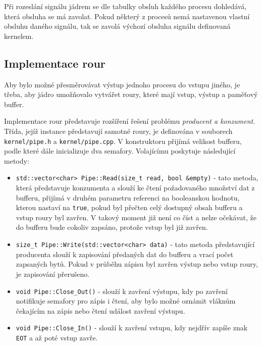 \documentclass[12pt, a4paper]{article}
\begin{document}
Při rozeslání signálu jádrem se dle tabulky obsluh každého procesu dohledává, která obsluha se má zavolat. Pokud některý z procesů nemá nastavenou vlastní obsluhu daného signálu, tak se zavolá výchozí obsluha signálu definovaná kernelem.

\subsection{Implementace rour}
Aby bylo možné přesměrovávat výstup jednoho procesu do vstupu jiného, je třeba, aby jádro umožňovalo vytvářet roury, které mají vstup, výstup a paměťový buffer.

Implementace rour představuje rozšíření řešení problému \textit{producent a konzument}. Třída, jejíž instance představují samotné roury, je definována v souborech \texttt{kernel/pipe.h} a \texttt{kernel/pipe.cpp}. V konstruktoru přijímá velikost bufferu, podle které dále inicializuje dva semafory. Volajícímu poskytuje následující metody:

\begin{itemize}

    \item \texttt{std::vector<char> Pipe::Read(size\_t read, bool \&empty)} - tato metoda, která představuje konzumenta a slouží ke čtení požadovaného množství dat z bufferu, přijímá v druhém parametru referenci na booleanskou hodnotu, kterou nastaví na \texttt{true}, pokud byl přečten celý dostupný obsah bufferu a vstup roury byl zavřen. V takový moment již není co číst a nelze očekávat, že do bufferu bude cokoliv zapsáno, protože vstup byl již zavřen.

    \item \texttt{size\_t Pipe::Write(std::vector<char> data)} - tato metoda představující producenta slouží k zapisování předaných dat do bufferu a vrací počet zapsaných bytů. Pokud v průběhu zápisu byl zavřen výstup nebo vstup roury, je zapisování přerušeno.

    \item \texttt{void Pipe::Close\_Out()} - slouží k zavření výstupu, kdy po zavření notifikuje semafory pro zápis i čtení, aby bylo možné oznámit vláknům čekajícím na zápis nebo čtení událost zavření výstupu.

    \item \texttt{void Pipe::Close\_In()} - slouží k zavření vstupu, kdy nejdřív zapíše znak \texttt{EOT} a až poté vstup zavře. 

\end{itemize}
\end{document}
